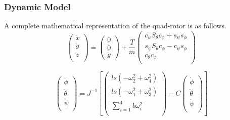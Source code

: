 \documentclass{beamer}
\begin{document}
\begin{frame}
\frametitle{Dynamic Model}
A complete mathematical representation of the quad-rotor is as follows.\\ 

\begin{equation}
    \label{lineareq}
    \left(
        \begin{array}{c}
           \ddot{x}\\
           \ddot{y}\\
           \ddot{z}\\
        \end{array}
    \right)
    = \left(
       \begin{array}{c}
        0\\
        0\\
        g  
      \end{array}
    \right)
    +\frac{T}{m}
     \left(
        \begin{array}{c}
             c_{\psi}S_{\theta}c_{\phi} + s_{\psi}s_{\phi} \\
             s_{\psi}S_{\theta}c_{\phi} - c_{\psi}s_{\phi} \\
             c_{\theta} c_{\phi} \\
        \end{array}
    \right)
\end{equation}

\begin{equation}
    \label{angulareq}
    \left(
        \begin{array}{c}
           \ddot{\phi}\\
           \ddot{\theta}\\
           \ddot{\psi}\\
        \end{array}
    \right) = J^{-1}
    \left[ \left(
        \begin{array}{c}
            l s (-\omega_2^2 + \omega_4^2)\\
            l s (-\omega_1^2 + \omega_3^2)\\ 
            \sum \limits_{i=1}^4 b \omega_i^2\\
        \end{array}
    \right) -
    C
    \left(
        \begin{array}{c}
           \dot{\phi}\\
           \dot{\theta}\\
           \dot{\psi}\\
        \end{array}
    \right)
    \right]
\end{equation}

\end{frame}
\end{document}
